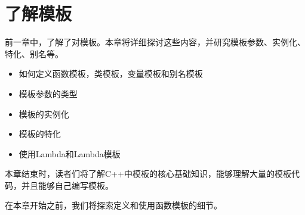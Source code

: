 \chapter{了解模板}
前一章中，了解了对模板。本章将详细探讨这些内容，并研究模板参数、实例化、特化、别名等。

\begin{itemize}
  \item 如何定义函数模板，类模板，变量模板和别名模板
  \item 模板参数的类型
  \item 模板的实例化
  \item 模板的特化
  \item 使用Lambda和Lambda模板
\end{itemize}

本章结束时，读者们将了解C++中模板的核心基础知识，能够理解大量的模板代码，并且能够自己编写模板。

在本章开始之前，我们将探索定义和使用函数模板的细节。












